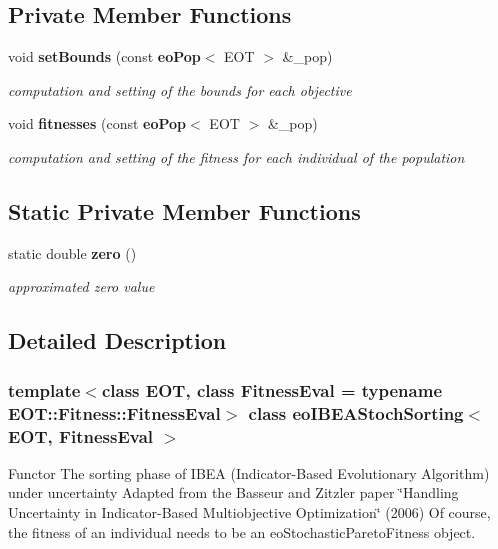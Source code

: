 \subsection*{Private Member Functions}
\begin{CompactItemize}
\item 
void {\bf set\-Bounds} (const {\bf eo\-Pop}$<$ EOT $>$ \&\_\-pop)
\begin{CompactList}\small\item\em computation and setting of the bounds for each objective \item\end{CompactList}\item 
void {\bf fitnesses} (const {\bf eo\-Pop}$<$ EOT $>$ \&\_\-pop)
\begin{CompactList}\small\item\em computation and setting of the fitness for each individual of the population \item\end{CompactList}\end{CompactItemize}
\subsection*{Static Private Member Functions}
\begin{CompactItemize}
\item 
static double {\bf zero} ()\label{classeoIBEAStochSorting_0cd3d638866730b7a8fdbd5a1c08c810}

\begin{CompactList}\small\item\em approximated zero value \item\end{CompactList}\end{CompactItemize}


\subsection{Detailed Description}
\subsubsection*{template$<$class EOT, class Fitness\-Eval = typename EOT::Fitness::Fitness\-Eval$>$ class eo\-IBEAStoch\-Sorting$<$ EOT, Fitness\-Eval $>$}

Functor The sorting phase of IBEA (Indicator-Based Evolutionary Algorithm) under uncertainty Adapted from the Basseur and Zitzler paper \char`\"{}Handling Uncertainty in Indicator-Based Multiobjective Optimization\char`\"{} (2006) Of course, the fitness of an individual needs to be an eo\-Stochastic\-Pareto\-Fitness object. 



